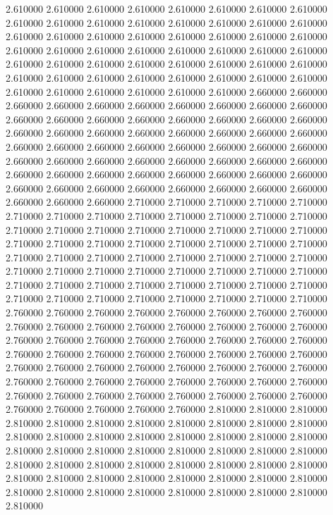 2.610000
2.610000
2.610000
2.610000
2.610000
2.610000
2.610000
2.610000
2.610000
2.610000
2.610000
2.610000
2.610000
2.610000
2.610000
2.610000
2.610000
2.610000
2.610000
2.610000
2.610000
2.610000
2.610000
2.610000
2.610000
2.610000
2.610000
2.610000
2.610000
2.610000
2.610000
2.610000
2.610000
2.610000
2.610000
2.610000
2.610000
2.610000
2.610000
2.610000
2.610000
2.610000
2.610000
2.610000
2.610000
2.610000
2.610000
2.610000
2.610000
2.610000
2.610000
2.610000
2.610000
2.610000
2.660000
2.660000
2.660000
2.660000
2.660000
2.660000
2.660000
2.660000
2.660000
2.660000
2.660000
2.660000
2.660000
2.660000
2.660000
2.660000
2.660000
2.660000
2.660000
2.660000
2.660000
2.660000
2.660000
2.660000
2.660000
2.660000
2.660000
2.660000
2.660000
2.660000
2.660000
2.660000
2.660000
2.660000
2.660000
2.660000
2.660000
2.660000
2.660000
2.660000
2.660000
2.660000
2.660000
2.660000
2.660000
2.660000
2.660000
2.660000
2.660000
2.660000
2.660000
2.660000
2.660000
2.660000
2.660000
2.660000
2.660000
2.660000
2.660000
2.660000
2.660000
2.710000
2.710000
2.710000
2.710000
2.710000
2.710000
2.710000
2.710000
2.710000
2.710000
2.710000
2.710000
2.710000
2.710000
2.710000
2.710000
2.710000
2.710000
2.710000
2.710000
2.710000
2.710000
2.710000
2.710000
2.710000
2.710000
2.710000
2.710000
2.710000
2.710000
2.710000
2.710000
2.710000
2.710000
2.710000
2.710000
2.710000
2.710000
2.710000
2.710000
2.710000
2.710000
2.710000
2.710000
2.710000
2.710000
2.710000
2.710000
2.710000
2.710000
2.710000
2.710000
2.710000
2.710000
2.710000
2.710000
2.710000
2.710000
2.710000
2.710000
2.710000
2.760000
2.760000
2.760000
2.760000
2.760000
2.760000
2.760000
2.760000
2.760000
2.760000
2.760000
2.760000
2.760000
2.760000
2.760000
2.760000
2.760000
2.760000
2.760000
2.760000
2.760000
2.760000
2.760000
2.760000
2.760000
2.760000
2.760000
2.760000
2.760000
2.760000
2.760000
2.760000
2.760000
2.760000
2.760000
2.760000
2.760000
2.760000
2.760000
2.760000
2.760000
2.760000
2.760000
2.760000
2.760000
2.760000
2.760000
2.760000
2.760000
2.760000
2.760000
2.760000
2.760000
2.760000
2.760000
2.760000
2.760000
2.760000
2.760000
2.760000
2.760000
2.810000
2.810000
2.810000
2.810000
2.810000
2.810000
2.810000
2.810000
2.810000
2.810000
2.810000
2.810000
2.810000
2.810000
2.810000
2.810000
2.810000
2.810000
2.810000
2.810000
2.810000
2.810000
2.810000
2.810000
2.810000
2.810000
2.810000
2.810000
2.810000
2.810000
2.810000
2.810000
2.810000
2.810000
2.810000
2.810000
2.810000
2.810000
2.810000
2.810000
2.810000
2.810000
2.810000
2.810000
2.810000
2.810000
2.810000
2.810000
2.810000
2.810000
2.810000
2.810000

